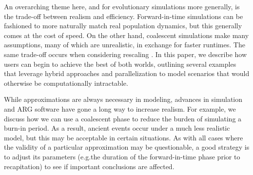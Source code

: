 \documentclass[12pt]{article}
\newcommand*{\eg}{e.g.\xcomma}
\begin{document}
An overarching theme here, and for evolutionary simulations more generally, is the trade-off between realism and efficiency.
Forward-in-time simulations can be fashioned to more naturally match real population dynamics,
but this generally comes at the cost of speed. On the other hand, coalescent simulations make many assumptions, many of which
are unrealistic, in exchange for faster runtimes.
The same trade-off occurs when considering rescaling \citep{cury_simulation_2022,dabi_population_2025}.
In this paper, we describe how users can begin to achieve the best of both worlds,
outlining several examples that leverage hybrid approaches and parallelization to model scenarios that would otherwise be
computationally intractable.

While approximations are always necessary in modeling, advances in simulation and ARG software have gone a long way to increase realism.
For example, we discuss how we
can use a coalescent phase to reduce the burden of simulating a burn-in period.
As a result, ancient events occur under a much less realistic model, but this may be acceptable in certain situations.
As with all cases where the validity of a particular approximation may be questionable, a good strategy is to adjust its parameters
(\eg the duration of the forward-in-time phase prior to recapitation) to see if important conclusions are affected.










\newpage
\appendix
\end{document}
